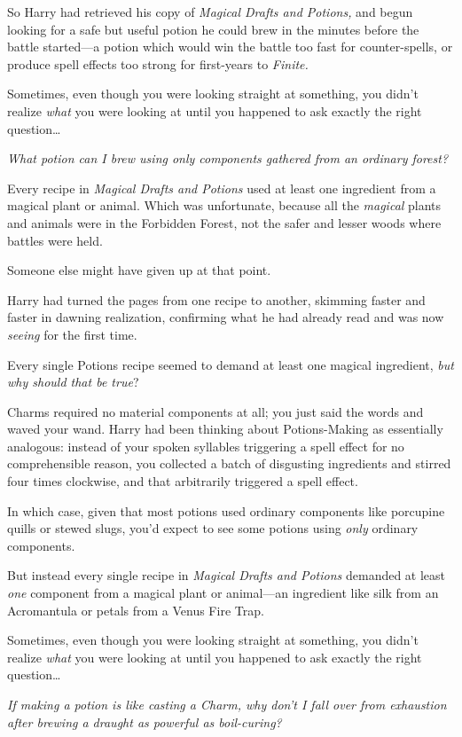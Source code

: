 So Harry had retrieved his copy of \emph{Magical Drafts and Potions,} and begun looking for a safe but useful potion he could brew in the minutes before the battle started—a potion which would win the battle too fast for counter-spells, or produce spell effects too strong for first-years to \emph{Finite.}

Sometimes, even though you were looking straight at something, you didn't realize \emph{what} you were looking at until you happened to ask exactly the right question…

\emph{What potion can I brew using only components gathered from an ordinary forest?}

Every recipe in \emph{Magical Drafts and Potions} used at least one ingredient from a magical plant or animal. Which was unfortunate, because all the \emph{magical} plants and animals were in the Forbidden Forest, not the safer and lesser woods where battles were held.

Someone else might have given up at that point.

Harry had turned the pages from one recipe to another, skimming faster and faster in dawning realization, confirming what he had already read and was now \emph{seeing} for the first time.

Every single Potions recipe seemed to demand at least one magical ingredient, \emph{but why should that be true}?

Charms required no material components at all; you just said the words and waved your wand. Harry had been thinking about Potions-Making as essentially analogous: instead of your spoken syllables triggering a spell effect for no comprehensible reason, you collected a batch of disgusting ingredients and stirred four times clockwise, and that arbitrarily triggered a spell effect.

In which case, given that most potions used ordinary components like porcupine quills or stewed slugs, you'd expect to see some potions using \emph{only} ordinary components.

But instead every single recipe in \emph{Magical Drafts and Potions} demanded at least \emph{one} component from a magical plant or animal—an ingredient like silk from an Acromantula or petals from a Venus Fire Trap.

Sometimes, even though you were looking straight at something, you didn't realize \emph{what} you were looking at until you happened to ask exactly the right question…

\emph{If making a potion is like casting a Charm, why don't I fall over from exhaustion after brewing a draught as powerful as boil-curing?}

